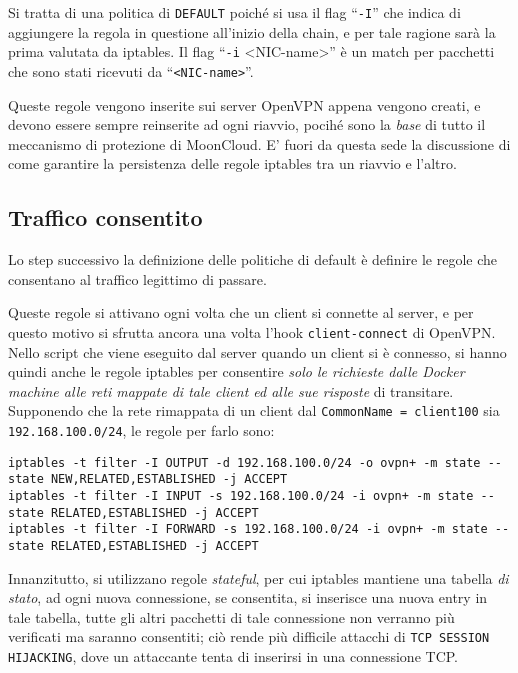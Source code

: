 		Si tratta di una politica di \texttt{DEFAULT} poiché si usa il flag ``\texttt{-I}''
		che indica di aggiungere la regola in questione all'inizio della chain, e per tale
		ragione sarà la prima valutata da iptables. Il flag ``\texttt{-i} <NIC-name>'' è un match
		per pacchetti che sono stati ricevuti da ``\texttt{<NIC-name>}''.
		
		
		Queste regole vengono inserite sui server OpenVPN appena vengono creati, e
		devono essere sempre reinserite ad ogni riavvio, pocihé sono la \textit{base}
		di tutto il meccanismo di protezione di MoonCloud. E' fuori da questa sede la discussione
		di come garantire la persistenza delle regole iptables tra un riavvio e l'altro.
		
		
		\subsection{Traffico consentito}
		Lo step successivo la definizione delle politiche di default è definire le regole che
		consentano al traffico legittimo di passare.
		
		Queste regole si attivano ogni volta che un client si connette al server, e per
		questo motivo si sfrutta ancora una volta l'hook \texttt{client-connect} di OpenVPN.
		Nello script che viene eseguito dal server quando un client si è connesso, si
		hanno quindi anche le regole iptables per consentire \textit{solo le richieste
		dalle Docker machine alle reti mappate di tale client ed alle sue risposte}
		di transitare.
		Supponendo che la rete rimappata di un client dal \texttt{CommonName = client100} sia
		\texttt{192.168.100.0/24}, le regole per farlo sono:
\begin{verbatim}
iptables -t filter -I OUTPUT -d 192.168.100.0/24 -o ovpn+ -m state --state NEW,RELATED,ESTABLISHED -j ACCEPT
iptables -t filter -I INPUT -s 192.168.100.0/24 -i ovpn+ -m state --state RELATED,ESTABLISHED -j ACCEPT
iptables -t filter -I FORWARD -s 192.168.100.0/24 -i ovpn+ -m state --state RELATED,ESTABLISHED -j ACCEPT
\end{verbatim}
		
		Innanzitutto, si utilizzano regole \textit{stateful}, per cui iptables mantiene
		una tabella \textit{di stato}, ad ogni nuova connessione, se consentita, si inserisce
		una nuova entry in tale tabella, tutte gli altri pacchetti di tale connessione non
		verranno più verificati ma saranno consentiti; ciò rende più difficile
		attacchi di \texttt{TCP SESSION HIJACKING}, dove un attaccante tenta di inserirsi in
		una connessione TCP.
		
